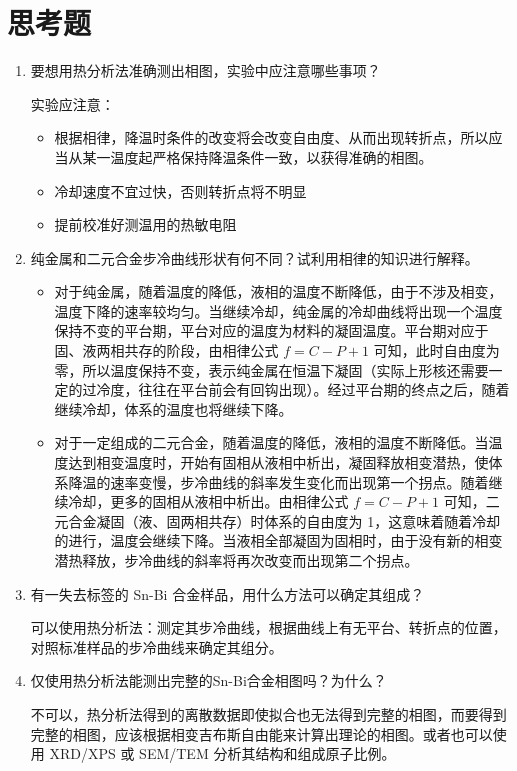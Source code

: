 \documentclass[a4paper,utf8]{article}
\begin{document}
\section{思考题}
    \begin{enumerate}
        \item 要想用热分析法准确测出相图，实验中应注意哪些事项？\par
        实验应注意：
        \begin{itemize}
            \item 根据相律，降温时条件的改变将会改变自由度、从而出现转折点，所以应当从某一温度起严格保持降温条件一致，以获得准确的相图。
            \item 冷却速度不宜过快，否则转折点将不明显
            \item 提前校准好测温用的热敏电阻
        \end{itemize}
        \item 纯金属和二元合金步冷曲线形状有何不同？试利用相律的知识进行解释。\par
        \begin{itemize}
            \item 对于纯金属，随着温度的降低，液相的温度不断降低，由于不涉及相变，温度下降的速率较均匀。当继续冷却，纯金属的冷却曲线将出现一个温度保持不变的平台期，平台对应的温度为材料的凝固温度。平台期对应于固、液两相共存的阶段，由相律公式 $f=C-P+1$ 可知，此时自由度为零，所以温度保持不变，表示纯金属在恒温下凝固（实际上形核还需要一定的过冷度，往往在平台前会有回钩出现）。经过平台期的终点之后，随着继续冷却，体系的温度也将继续下降。
            \item 对于一定组成的二元合金，随着温度的降低，液相的温度不断降低。当温度达到相变温度时，开始有固相从液相中析出，凝固释放相变潜热，使体系降温的速率变慢，步冷曲线的斜率发生变化而出现第一个拐点。随着继续冷却，更多的固相从液相中析出。由相律公式 $f=C-P+1$ 可知，二元合金凝固（液、固两相共存）时体系的自由度为 1，这意味着随着冷却的进行，温度会继续下降。当液相全部凝固为固相时，由于没有新的相变潜热释放，步冷曲线的斜率将再次改变而出现第二个拐点。
        \end{itemize}
        \item 有一失去标签的 Sn-Bi 合金样品，用什么方法可以确定其组成？\par
        可以使用热分析法：测定其步冷曲线，根据曲线上有无平台、转折点的位置，对照标准样品的步冷曲线来确定其组分。
        \item 仅使用热分析法能测出完整的Sn-Bi合金相图吗？为什么？\par
        不可以，热分析法得到的离散数据即使拟合也无法得到完整的相图，而要得到完整的相图，应该根据相变吉布斯自由能来计算出理论的相图。或者也可以使用 XRD/XPS 或 SEM/TEM 分析其结构和组成原子比例。
    \end{enumerate}
\end{document}

